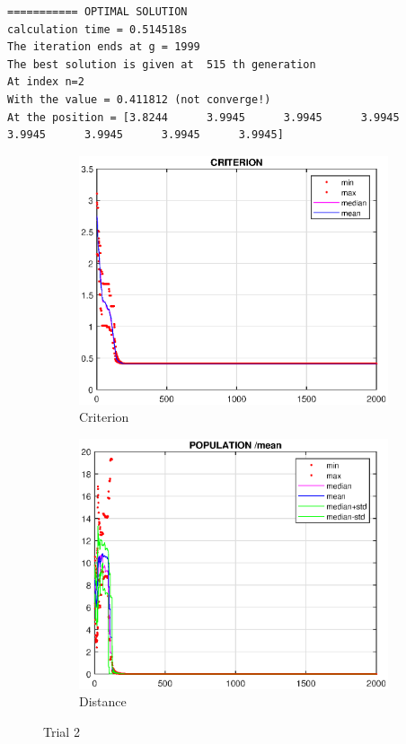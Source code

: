 \documentclass{CSArticle}[english]
\begin{document}
\begin{lstlisting}[style=RESULT,caption={trial 2}]
=========== OPTIMAL SOLUTION
calculation time = 0.514518s 
The iteration ends at g = 1999 
The best solution is given at  515 th generation 
At index n=2 
With the value = 0.411812 (not converge!)
At the position = [3.8244      3.9945      3.9945      3.9945      3.9945      3.9945      3.9945      3.9945] 
\end{lstlisting}
\begin{figure}[h!]
\centering
\begin{subfigure}[b]{0.45\textwidth}
         \centering
         \includegraphics[scale=0.45]{figure/Q5_c2.eps}
         \caption{Criterion}
         \label{fig:Q5_c2}
     \end{subfigure}
     \hfill
     \begin{subfigure}[b]{0.45\textwidth}
         \centering
         \includegraphics[scale=0.45]{figure/Q5_p2.eps}
         \caption{Distance}
         \label{fig:Q5_p2}
     \end{subfigure}
     \caption{Trial 2}
     \label{fig:trial2}
\end{figure}
\end{document}
